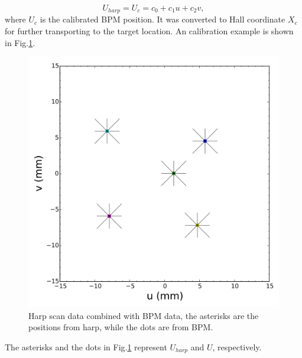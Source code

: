 \documentclass[english,review,number,sort&compress]{elsarticle}
\begin{document}
\begin{equation}
U_{harp}=U_{c}=c_{0}+c_{1}u+c_{2}v,\label{eq:Uvu}
\end{equation}
where $U_{c}$ is the calibrated BPM position. It was converted to Hall coordinate $X_{c}$ for further transporting to the target location. An calibration example is shown in Fig.\ref{fig:Harpscan}. 
\begin{figure}[tbph]
\begin{centering}
\includegraphics[width=0.4\columnwidth]{harpscan}
\par\end{centering}

\protect\caption{\label{fig:Harpscan}Harp scan data combined with BPM data, the asterisks are the positions from harp, while the dots are from BPM. }
\end{figure}
 The asterisks and the dots in Fig.\ref{fig:Harpscan} represent $U_{harp}$ and $U$, respectively. 
\end{document}
